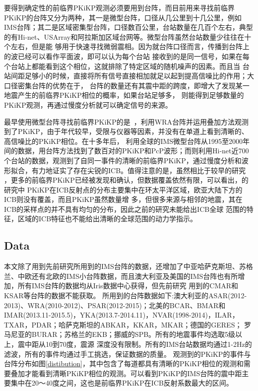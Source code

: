 要得到确定性的前临界PKiKP观测必须要用到台阵，而目前用来寻找前临界PKiKP的台阵又分为两种，其一是微型台阵，口径从几公里到十几公里，例如IMS台阵；其二是区域密集型台阵，口径数百公里，台站数量在几百个左右，典型的有Hi-net、USArray和阿拉斯加区域台网等。微型台阵虽然台站数量少往往在十个左右，但是能
够用于快速寻找微弱震相。因为就台阵口径而言，传播到台阵上的波已经可以看作平面波，即可以认为每个台站
接收到的是同一信号，如果在每个台站上都能看到这个相位，这就排除了特定区域的随机噪声的因素。而且当
台站间距足够小的时候，直接将所有信号直接相加就足以起到提高信噪比的作用；大口径密集台阵的优势在于， 台阵的数量还有其震中距的跨度，即增大了发现某一地震产生的前临界PKiKP相位的概率，如果台站足够多，
则能得到足够数量的PKiKP观测，再通过慢度分析就可以确定信号的来源。

最早使用微型台阵寻找前临界PKiKP的是~\cite{Souriau1989}，利用WRA台阵并运用叠加方法观测到了PKiKP，由于年代较早，受限与仪器等因素，并没有在单道上看到清晰的、高信噪比的PKiKP相位。在十多年后，
\cite{Koper2003}利用全球的IMS微型台阵从1995至2000年间的数据，用台阵方法找到了数百对的PKiKP和PcP波形；而\cite{Kawakatsu2006}则利用Hi-net近700个台站的数据，观测到了自同一事件的清晰的前临界PKiKP，通过慢度分析和波形拟合，有力地证实了存在尖锐的ICB。值得注意的是，虽然相比于较早的研究
，更多的前临界PKiKP已经被发现和确认，但数据覆盖依然有限，可以看出，\cite{Koper2003}的研究中
PKiKP在ICB反射点的分布主要集中在环太平洋区域，欧亚大陆下方的ICB则没有覆盖，而且PKiKP虽然数量增
多，但很多来源与相邻的地震，其在ICB的采样点的并不具有均匀的分布，因此之前的研究未能给出ICB全球
范围的特征，区域的ICB特征也不能给出清晰的全球范围的动力学指示。

\subsection{Data}

本文除了用到先前研究所用到的IMS台阵的数据，还增加了中亚哈萨克斯坦、苏格兰、中欧还有北欧的IMS小台阵数据，而且澳大利亚及美国的IMS台阵也有所增加，所有IMS台阵的数据均从Iris数据中心获得，但先前研究
用到的CMAR和KSAR等台阵的数据不能获取。
所用到的台阵数据如下:澳大利亚的ASAR(2012-2013)、WRA(2010-2012)、PSAR(2012-2015)；北美的BCAR、BMAR和IMAR(2013.11-2015.5)，YKA(2013.7-2014.11)，NVAR(1998-2014)，ILAR，TXAR，PDAR；哈萨克斯坦的ABKAR，KKAR，MKAR；德国的GERES；
罗马尼亚的BURAR；苏格兰的EKB；挪威的SPB。所有的地震事件均选取5级以上，震中距从10到70度，震源
深度没有限制。所有的IMS台站数据均通过1-2Hz的滤波，所有的事件均通过手工挑选，保证数据的质量。
观测到的PKiKP的事件与台阵分布如图\ref{distibution}，其中包含了每道都具有清晰的PKiKP相位的观测和需要叠加才能看到清晰PKiKP相位的观测。可以看到PKiKP的IMS台阵的震中距主要集中在20～40度之间，这也是前临界PKiKP在ICB反射系数最大的区间。

